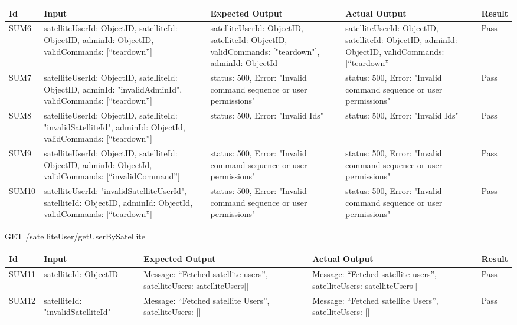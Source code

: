 \documentclass[12pt, titlepage]{article}
\begin{document}
\begin{center}
\begin{tabular}{|p{2cm} | p{3cm} |p{2cm}| p{2cm} |p{2cm}|}
\hline
\textbf{Id}  & \textbf{Input} & \textbf{Expected Output} & \textbf{Actual Output} & \textbf{Result} \\
\hline
SUM6 &  { satelliteUserId: ObjectID,
satelliteId: ObjectID,
adminId: ObjectID,
validCommands: [“teardown”] } & { satelliteUserId: ObjectID,
satelliteId: ObjectID,
validCommands: ["teardown"],
adminId: ObjectId } & { satelliteUserId: ObjectID,
satelliteId: ObjectID,
adminId: ObjectID,
validCommands: [“teardown”] } & Pass
\\
\hline
SUM7 &  { satelliteUserId: ObjectID,
satelliteId: ObjectID,
adminId: "invalidAdminId",
validCommands: [“teardown”] }
 & { status: 500,
Error: "Invalid command sequence or user permissions" }
 & { status: 500,
Error: "Invalid command sequence or user permissions" }
 & Pass
\\
\hline
SUM8 &   { satelliteUserId: ObjectID,
satelliteId: "invalidSatelliteId",
adminId: ObjectId,
validCommands: [“teardown”] }
 & { status: 500,
Error: "Invalid Ids" }
 & { status: 500,
Error: "Invalid Ids" }
 & Pass
\\
\hline
SUM9 &   { satelliteUserId: ObjectID,
satelliteId: ObjectID,
adminId: ObjectId,
validCommands: [“invalidCommand”] }
 & { status: 500,
Error: "Invalid command sequence or user permissions" }
 & { status: 500,
Error: "Invalid command sequence or user permissions" }
 & Pass
\\
\hline
SUM10 &   { satelliteUserId: "invalidSatelliteUserId",
satelliteId: ObjectID,
adminId: ObjectId,
validCommands: [“teardown”] }
 & { status: 500,
Error: "Invalid command sequence or user permissions" }
 & { status: 500,
Error: "Invalid command sequence or user permissions" }
 & Pass
\\
\hline

\end{tabular}

\end{center}


GET /satelliteUser/getUserBySatellite

\begin{center}
\begin{tabular}{|p{2cm} | p{3cm} |p{2cm}| p{2cm} |p{2cm}|}
\hline
\textbf{Id}  & \textbf{Input} & \textbf{Expected Output} & \textbf{Actual Output} & \textbf{Result} \\
\hline
SUM11 &  { satelliteId: ObjectID } & { Message: “Fetched satellite users”,
satelliteUsers: satelliteUsers[] } & { Message: “Fetched satellite users”,
satelliteUsers: satelliteUsers[] } & Pass
\\
\hline
SUM12  & { satelliteId: "invalidSatelliteId"} & { Message: “Fetched satellite Users”,
satelliteUsers: [] } & { Message: “Fetched satellite Users”,
satelliteUsers: [] } & Pass
\\
\hline

\end{tabular}

\end{center}
\end{document}
